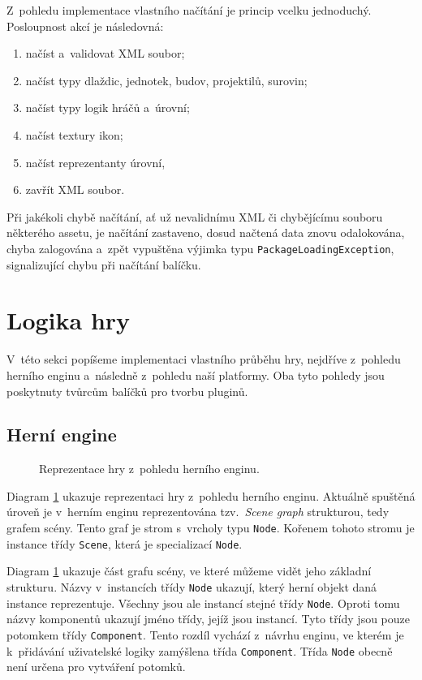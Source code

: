 Z~pohledu implementace vlastního načítání je princip vcelku jednoduchý. Posloupnost akcí je následovná:

\begin{enumerate}
	\item načíst a~validovat XML soubor;
	\item načíst typy dlaždic, jednotek, budov, projektilů, surovin;
	\item načíst typy logik hráčů a~úrovní;
	\item načíst textury ikon;
	\item načíst reprezentanty úrovní,
	\item zavřít XML soubor.
\end{enumerate}

Při jakékoli chybě načítání, ať už nevalidnímu XML či chybějícímu souboru některého assetu, je načítání zastaveno, dosud načtená data znovu odalokována, chyba zalogována a~zpět vypuštěna výjimka typu \texttt{PackageLoadingException}, signalizující chybu při načítání balíčku.

\section{Logika hry}
V~této sekci popíšeme implementaci vlastního průběhu hry, nejdříve z~pohledu herního enginu a~následně z~pohledu naší platformy. Oba tyto pohledy jsou poskytnuty tvůrcům balíčků pro tvorbu pluginů.

\subsection{Herní engine}
\label{sec:engineview}

\begin{figure}[h]
	\centering
	\fontsize{8pt}{11pt}\selectfont
	\def\svgwidth{\textwidth}
	
	\caption{Reprezentace hry z~pohledu herního enginu.}
	\label{fig:scenegraph}
\end{figure}


Diagram \ref{fig:scenegraph} ukazuje reprezentaci hry z~pohledu herního enginu. Aktuálně spuštěná úroveň je v~herním enginu reprezentována tzv.~\textit{Scene graph} strukturou, tedy grafem scény. Tento graf je strom s~vrcholy typu \texttt{Node}. Kořenem tohoto stromu je instance třídy \texttt{Scene}, která je specializací \texttt{Node}.

Diagram \ref{fig:scenegraph} ukazuje část grafu scény, ve které můžeme vidět jeho základní strukturu. Názvy v~instancích třídy \texttt{Node} ukazují, který herní objekt daná instance reprezentuje. Všechny jsou ale instancí stejné třídy \texttt{Node}. Oproti tomu názvy komponentů ukazují jméno třídy, jejíž jsou instancí. Tyto třídy jsou pouze potomkem třídy \texttt{Component}. Tento rozdíl vychází z~návrhu enginu, ve kterém je k~přidávání uživatelské logiky zamýšlena třída \texttt{Component}. Třída \texttt{Node} obecně není určena pro vytváření potomků.

